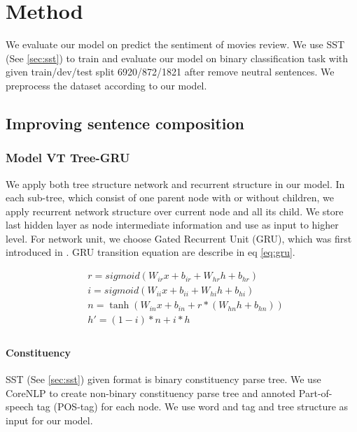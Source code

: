 \chapter{Method}
We evaluate our model on predict the sentiment of movies review. We use SST (See \ref{sec:sst}) to train and evaluate our model on binary classification task with given train/dev/test split 6920/872/1821 after remove neutral sentences. We preprocess the dataset according to our model.

\section{Improving sentence composition}

\subsection{Model VT Tree-GRU}\label{sec:VTtree}
We apply both tree structure network and recurrent structure in our model. In each sub-tree, which consist of one parent node with or without children, we apply recurrent network structure over current node and all its child. We store last hidden layer as node intermediate information and use as input to higher level. For network unit, we choose Gated Recurrent Unit (GRU), which was first introduced in \cite{cho2014learning}. GRU transition equation are describe in eq \ref{eq:gru}.

\begin{equation}
\label{eq:gru}
\begin{aligned}
&r = sigmoid(W_{ir} x + b_{ir} + W_{hr} h + b_{hr}) \\
&i = sigmoid(W_{ii} x + b_{ii} + W_{hi} h + b_{hi}) \\
&n = \tanh(W_{in} x + b_{in} + r * (W_{hn} h + b_{hn})) \\
&h' = (1 - i) * n + i * h\\
\end{aligned}
\end{equation}

\subsubsection{Constituency}
SST (See \ref{sec:sst}) given format is binary constituency parse tree. We use CoreNLP \cite{manning2014stanford} to create non-binary constituency parse tree and annoted Part-of-speech tag (POS-tag) for each node. We use word and tag and tree structure as input for our model.

